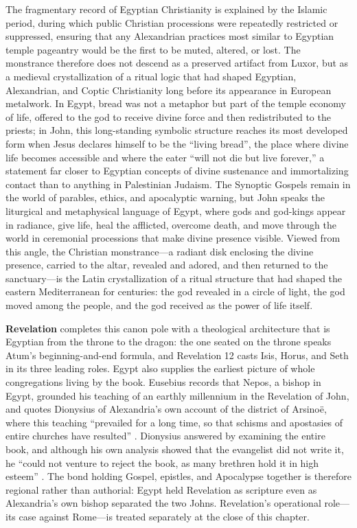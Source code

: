 The fragmentary record of Egyptian Christianity is explained by the Islamic period, during which public Christian processions were repeatedly restricted or suppressed, ensuring that any Alexandrian practices most similar to Egyptian temple pageantry would be the first to be muted, altered, or lost.
The monstrance therefore does not descend as a preserved artifact from Luxor, but as a medieval crystallization of a ritual logic that had shaped Egyptian, Alexandrian, and Coptic Christianity long before its appearance in European metalwork.
In Egypt, bread was not a metaphor but part of the temple economy of life, offered to the god to receive divine force and then redistributed to the priests; in John, this long-standing symbolic structure reaches its most developed form when Jesus declares himself to be the ``living bread'', the place where divine life becomes accessible and where the eater ``will not die but live forever,'' a statement far closer to Egyptian concepts of divine sustenance and immortalizing contact than to anything in Palestinian Judaism.
The Synoptic Gospels remain in the world of parables, ethics, and apocalyptic warning, but John speaks the liturgical and metaphysical language of Egypt, where gods and god-kings appear in radiance, give life, heal the afflicted, overcome death, and move through the world in ceremonial processions that make divine presence visible.
Viewed from this angle, the Christian monstrance---a radiant disk enclosing the divine presence, carried to the altar, revealed and adored, and then returned to the sanctuary---is the Latin crystallization of a ritual structure that had shaped the eastern Mediterranean for centuries: the god revealed in a circle of light, the god moved among the people, and the god received as the power of life itself.

\textbf{Revelation} completes this canon pole with a theological architecture that is Egyptian from the throne to the dragon: the one seated on the throne speaks Atum's beginning-and-end formula, and Revelation 12 casts Isis, Horus, and Seth in its three leading roles.
Egypt also supplies the earliest picture of whole congregations living by the book.
Eusebius records that Nepos, a bishop in Egypt, grounded his teaching of an earthly millennium in the Revelation of John, and quotes Dionysius of Alexandria's own account of the district of Arsinoë, where this teaching ``prevailed for a long time, so that schisms and apostasies of entire churches have resulted'' \cite[7.24]{eusebius:he}.
Dionysius answered by examining the entire book, and although his own analysis showed that the evangelist did not write it, he ``could not venture to reject the book, as many brethren hold it in high esteem'' \cite[7.25]{eusebius:he}.
The bond holding Gospel, epistles, and Apocalypse together is therefore regional rather than authorial: Egypt held Revelation as scripture even as Alexandria's own bishop separated the two Johns.
Revelation's operational role---its case against Rome---is treated separately at the close of this chapter.

